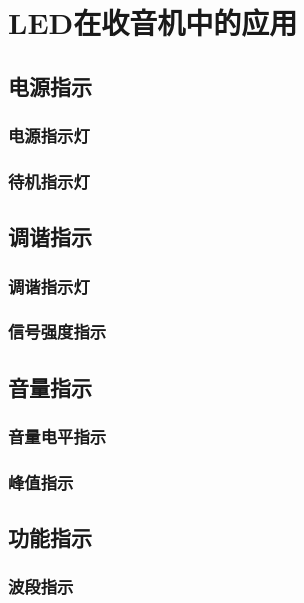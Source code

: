 \documentclass[12pt,UTF8]{ctexbook}
\begin{document}
\chapter{LED在收音机中的应用}

\section{电源指示}

\subsection{电源指示灯}

\subsection{待机指示灯}

\section{调谐指示}

\subsection{调谐指示灯}

\subsection{信号强度指示}

\section{音量指示}

\subsection{音量电平指示}

\subsection{峰值指示}

\section{功能指示}

\subsection{波段指示}
\end{document}
